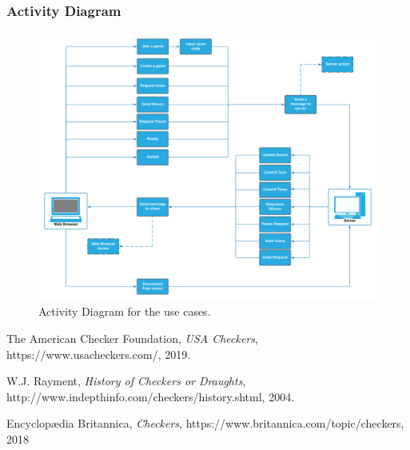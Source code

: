 \documentclass[10pt]{article}
\begin{document}
\subsubsection{Activity Diagram}
\begin{figure}[h!]
    \centering
    \includegraphics[width=16cm]{UseCaseDiagram.png}
    \caption{Activity Diagram for the use cases.}
\end{figure}
\pagebreak

\begin{thebibliography}{9}

  The American Checker Foundation,
  \textit{USA Checkers},
  https://www.usacheckers.com/,
  2019.

W.J. Rayment,
\textit{History of Checkers or Draughts},
http://www.indepthinfo.com/checkers/history.shtml,
2004.

Encyclopædia Britannica,
\textit{Checkers},
https://www.britannica.com/topic/checkers,
2018
\end{thebibliography}
\end{document}
